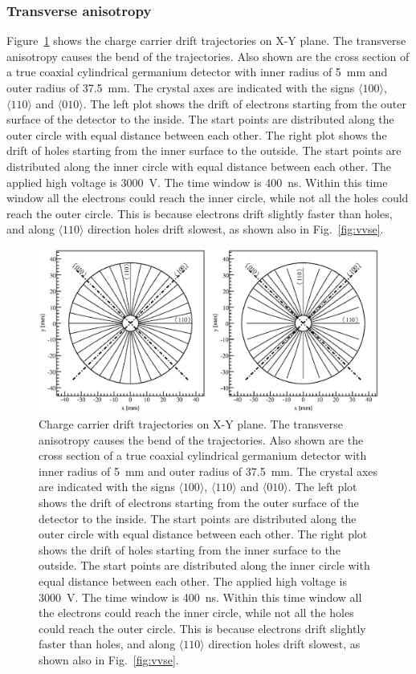 \subsubsection{Transverse anisotropy}
\label{subsec:tran}
Figure~\ref{fig:trjs} shows the charge carrier drift trajectories on X-Y plane. The transverse anisotropy causes the bend of the trajectories. Also shown are the cross section of a true coaxial cylindrical germanium detector with inner radius of 5~mm and outer radius of 37.5~mm. The crystal axes are indicated with the signs $\langle 100 \rangle$, $\langle 110 \rangle$ and $\langle 010 \rangle$. The left plot shows the drift of electrons starting from the outer surface of the detector to the inside. The start points are distributed along the outer circle with equal distance between each other. The right plot shows the drift of holes starting from the inner surface to the outside. The start points are distributed along the inner circle with equal distance between each other. The applied high voltage is 3000~V. The time window is 400~ns. Within this time window all the electrons could reach the inner circle, while not all the holes could reach the outer circle.  This is because electrons drift slightly faster than holes, and along $\langle 110 \rangle$ direction holes drift slowest, as shown also in Fig.~\ref{fig:vvse}.
\begin{figure}[tbhp]
  \centering
  \includegraphics[width=1.0\textwidth]{trjs}
  \caption{Charge carrier drift trajectories on X-Y plane. The     transverse anisotropy causes the bend of the trajectories. Also     shown are the cross section of a true coaxial cylindrical     germanium detector with inner radius of 5~mm and outer radius of     37.5~mm. The crystal axes are indicated with the signs $\langle     100 \rangle$, $\langle 110 \rangle$ and $\langle 010 \rangle$. The     left plot shows the drift of electrons starting from the outer     surface of the detector to the inside. The start points are     distributed along the outer circle with equal distance between     each other. The right plot shows the drift of holes starting from     the inner surface to the outside. The start points are distributed     along the inner circle with equal distance between each other. The     applied high voltage is 3000~V. The time window is 400~ns. Within     this time window all the electrons could reach the inner circle,     while not all the holes could reach the outer circle. This is     because electrons drift slightly faster than holes, and along     $\langle 110 \rangle$ direction holes drift slowest, as shown also     in Fig.~\ref{fig:vvse}.}
  \label{fig:trjs}
\end{figure}


